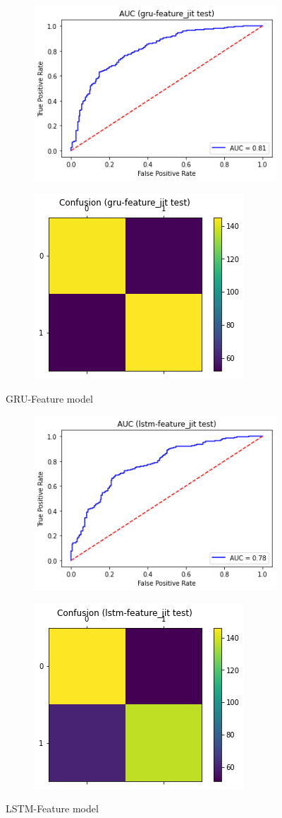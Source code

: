 \documentclass[format=sigconf, nonacm=true, review=true, screen=true]{acmart}
\begin{document}
\newpage
\begin{figure}[H]
     \centering
     \begin{subfigure}
         \centering
         \includegraphics[width=0.24\columnwidth]{figures/gru-feature-roc.png}
     \end{subfigure}
     \begin{subfigure}
         \centering
         \includegraphics[width=0.24\columnwidth]{figures/gru-feature-cm.png}
     \end{subfigure}
     \caption{GRU-Feature model}
     \label{fig:gru-feature-roc-cm}
     
     \centering
     \begin{subfigure}
         \centering
         \includegraphics[width=0.24\columnwidth]{figures/lstm-feature-roc.png}
     \end{subfigure}
     \begin{subfigure}
         \centering
         \includegraphics[width=0.24\columnwidth]{figures/lstm-feature-cm.png}
     \end{subfigure}
     \caption{LSTM-Feature model}
     \label{fig:lstm-feature-roc-cm}
\end{figure}

\newpage
\end{document}
